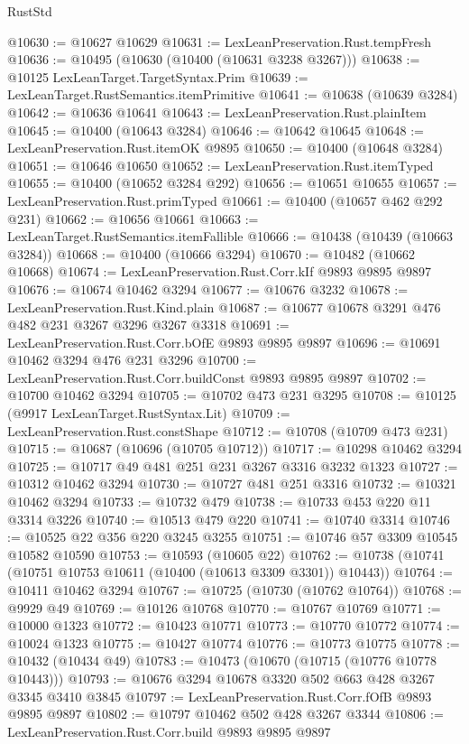 \begin{lexlean}{RustStd}
\begin{coremodule}
{\begin{coremodule}
{{{{{{{{{{{{{{{{{{{{{{{{{@10630 := @10627 @10629
@10631 := LexLeanPreservation.Rust.tempFresh
@10636 := @10495 (@10630 (@10400 (@10631 @3238 @3267)))
@10638 := @10125 LexLeanTarget.TargetSyntax.Prim
@10639 := LexLeanTarget.RustSemantics.itemPrimitive
@10641 := @10638 (@10639 @3284)
@10642 := @10636 @10641
@10643 := LexLeanPreservation.Rust.plainItem
@10645 := @10400 (@10643 @3284)
@10646 := @10642 @10645
@10648 := LexLeanPreservation.Rust.itemOK @9895
@10650 := @10400 (@10648 @3284)
@10651 := @10646 @10650
@10652 := LexLeanPreservation.Rust.itemTyped
@10655 := @10400 (@10652 @3284 @292)
@10656 := @10651 @10655
@10657 := LexLeanPreservation.Rust.primTyped
@10661 := @10400 (@10657 @462 @292 @231)
@10662 := @10656 @10661
@10663 := LexLeanTarget.RustSemantics.itemFallible
@10666 := @10438 (@10439 (@10663 @3284))
@10668 := @10400 (@10666 @3294)
@10670 := @10482 (@10662 @10668)
@10674 := LexLeanPreservation.Rust.Corr.kIf @9893 @9895 @9897
@10676 := @10674 @10462 @3294
@10677 := @10676 @3232
@10678 := LexLeanPreservation.Rust.Kind.plain
@10687 := @10677 @10678 @3291 @476 @482 @231 @3267 @3296 @3267 @3318
@10691 := LexLeanPreservation.Rust.Corr.bOfE @9893 @9895 @9897
@10696 := @10691 @10462 @3294 @476 @231 @3296
@10700 := LexLeanPreservation.Rust.Corr.buildConst @9893 @9895 @9897
@10702 := @10700 @10462 @3294
@10705 := @10702 @473 @231 @3295
@10708 := @10125 (@9917 LexLeanTarget.RustSyntax.Lit)
@10709 := LexLeanPreservation.Rust.constShape
@10712 := @10708 (@10709 @473 @231)
@10715 := @10687 (@10696 (@10705 @10712))
@10717 := @10298 @10462 @3294
@10725 := @10717 @49 @481 @251 @231 @3267 @3316 @3232 @1323
@10727 := @10312 @10462 @3294
@10730 := @10727 @481 @251 @3316
@10732 := @10321 @10462 @3294
@10733 := @10732 @479
@10738 := @10733 @453 @220 @11 @3314 @3226
@10740 := @10513 @479 @220
@10741 := @10740 @3314
@10746 := @10525 @22 @356 @220 @3245 @3255
@10751 := @10746 @57 @3309 @10545 @10582 @10590
@10753 := @10593 (@10605 @22)
@10762 := @10738 (@10741 (@10751 @10753 @10611 (@10400 (@10613 @3309 @3301)) @10443))
@10764 := @10411 @10462 @3294
@10767 := @10725 (@10730 (@10762 @10764))
@10768 := @9929 @49
@10769 := @10126 @10768
@10770 := @10767 @10769
@10771 := @10000 @1323
@10772 := @10423 @10771
@10773 := @10770 @10772
@10774 := @10024 @1323
@10775 := @10427 @10774
@10776 := @10773 @10775
@10778 := @10432 (@10434 @49)
@10783 := @10473 (@10670 (@10715 (@10776 @10778 @10443)))
@10793 := @10676 @3294 @10678 @3320 @502 @663 @428 @3267 @3345 @3410 @3845
@10797 := LexLeanPreservation.Rust.Corr.fOfB @9893 @9895 @9897
@10802 := @10797 @10462 @502 @428 @3267 @3344
@10806 := LexLeanPreservation.Rust.Corr.build @9893 @9895 @9897
}}}}}}}}}}}}}}}}}}}}}}}}}
\end{coremodule}}
\end{coremodule}
\end{lexlean}
